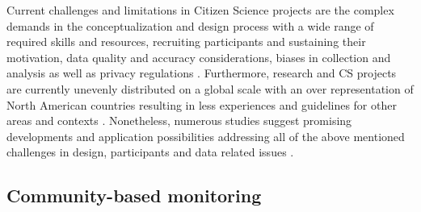 {Current challenges and limitations in Citizen Science projects are the complex demands in the conceptualization and design process with a wide range of required skills and resources, recruiting participants and sustaining their motivation, data quality and accuracy considerations, biases in collection and analysis as well as privacy regulations \autocite{fraislCitizenScienceEnvironmental2022}. Furthermore, research and CS projects are currently unevenly distributed on a global scale with an over representation of North American countries resulting in less experiences and guidelines for other areas and contexts \autocite{kirschkeCitizenScienceProjects2022, zhengCrowdsourcingMethodsData2018}. Nonetheless, numerous studies suggest promising developments and application possibilities addressing all of the above mentioned challenges in design, participants and data related issues \autocite{buckinghamshumGlobalParticipatoryPlatform2012,buddeParticipatorySensingParticipatory2017,escaECSACharacteristicsCitizen2020,fraislCitizenScienceEnvironmental2022,lowryGrowingPainsCrowdsourced2019,pocockStrategicFrameworkSupport,ruttenHowGetKeep2017,weeserCitizenSciencePioneers2018a}. 

\subsection{Community-based monitoring}\label{subsec:cbm}


}
